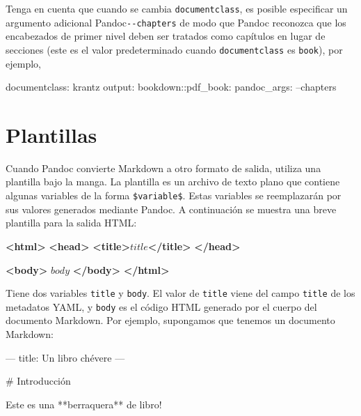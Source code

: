 \documentclass[12pt,]{krantz}
\makeatletter
\newenvironment{Shaded}{\begin{snugshade}}{\end{snugshade}}
\newcommand{\KeywordTok}[1]{\textcolor[rgb]{0.13,0.29,0.53}{\textbf{#1}}}
\newcommand{\FunctionTok}[1]{\textcolor[rgb]{0.00,0.00,0.00}{#1}}
\newcommand{\AttributeTok}[1]{\textcolor[rgb]{0.77,0.63,0.00}{#1}}
\newcommand{\NormalTok}[1]{#1}
\newenvironment{kframe}{%
\medskip{}
\setlength{\fboxsep}{.8em}
 \def\at@end@of@kframe{}%
 \ifinner\ifhmode%
  \def\at@end@of@kframe{\end{minipage}}%
  \begin{minipage}{\columnwidth}%
 \fi\fi%
 \def\FrameCommand##1{\hskip\@totalleftmargin \hskip-\fboxsep
 \colorbox{shadecolor}{##1}\hskip-\fboxsep
     \hskip-\linewidth \hskip-\@totalleftmargin \hskip\columnwidth}%
 \MakeFramed {\advance\hsize-\width
   \@totalleftmargin\z@ \linewidth\hsize
   \@setminipage}}%
 {\par\unskip\endMakeFramed%
 \at@end@of@kframe}
\renewenvironment{Shaded}{\begin{kframe}}{\end{kframe}}
\theoremstyle{definition}
\theoremstyle{definition}
\theoremstyle{definition}
\theoremstyle{remark}
\makeatother
\begin{document}
Tenga en cuenta que cuando se cambia \texttt{documentclass}, es posible
especificar un argumento adicional Pandoc\texttt{-\/-chapters} de modo
que Pandoc reconozca que los encabezados de primer nivel deben ser
tratados como capítulos en lugar de secciones (este es el valor
predeterminado cuando \texttt{documentclass} es \texttt{book}), por
ejemplo,

\begin{Shaded}
\begin{Highlighting}[]
\FunctionTok{documentclass:}\AttributeTok{ krantz}
\FunctionTok{output:}
  \FunctionTok{bookdown:}\AttributeTok{:pdf_book:}
    \FunctionTok{pandoc_args:}\AttributeTok{ --chapters}
\end{Highlighting}
\end{Shaded}

\section{Plantillas}\label{plantillas}

Cuando Pandoc convierte Markdown a otro formato de salida, utiliza una
plantilla bajo la manga. La plantilla es un archivo de texto plano que
contiene algunas variables de la forma \texttt{\$variable\$}. Estas
variables se reemplazarán por sus valores generados mediante Pandoc. A
continuación se muestra una breve plantilla para la salida HTML:

\begin{Shaded}
\begin{Highlighting}[]
\KeywordTok{<html>}
  \KeywordTok{<head>}
    \KeywordTok{<title>}\NormalTok{$title$}\KeywordTok{</title>}
  \KeywordTok{</head>}
  
  \KeywordTok{<body>}
\NormalTok{  $body$}
  \KeywordTok{</body>}
\KeywordTok{</html>}
\end{Highlighting}
\end{Shaded}

Tiene dos variables \texttt{title} y \texttt{body}. El valor de
\texttt{title} viene del campo \texttt{title} de los metadatos YAML, y
\texttt{body} es el código HTML generado por el cuerpo del documento
Markdown. Por ejemplo, supongamos que tenemos un documento Markdown:

\begin{Shaded}
\begin{Highlighting}[]
\NormalTok{---}
\NormalTok{title: Un libro chévere}
\NormalTok{---}

\FunctionTok{# Introducción}

\NormalTok{Este es una **berraquera** de libro!}
\end{Highlighting}
\end{Shaded}
\end{document}

